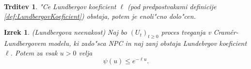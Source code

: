 \documentclass[12pt, a4paper, reqno]{amsart}
\theoremstyle{definition}
\theoremstyle{plain}
\newtheorem{izrek}[definicija]{Izrek}
\newtheorem{trditev}[definicija]{Trditev}
\newcommand{\1}{\mathds{1}}
\begin{document}
            \begin{trditev}
                "Ce Lundbergov koeficient $\ell$ (pod predpostvakami definicije \ref{def:LundbergovKoeficient})
                obstaja, potem je enoli"cno dolo"cen.
                \label{trd:enolicnostLundbergovegaKoeficienta}
            \end{trditev}

            \begin{izrek}(Lundbergova neenakost)
                Naj bo $(U_t)_{t\geq0}$ proces tveganja v Cramér-Lundbergovem modelu, ki zado"sca NPC in 
                naj zanj obstaja Lundebrgov koeficient $\ell$. Potem za vsak $u>0$ velja
                \begin{equation*}
                    \psi(u) \leq e^{-\ell u}.
                \end{equation*}
                \label{izr:LundbergovaNeenakost}
            \end{izrek}
\end{document}
